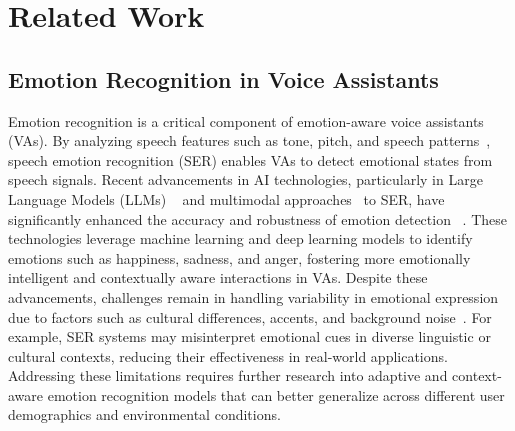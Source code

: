 \section{Related Work}
\subsection{Emotion Recognition in Voice Assistants}
Emotion recognition is a critical component of emotion-aware voice assistants (VAs). By analyzing speech features such as tone, pitch, and speech patterns~\cite{el2011survey,rathi2024analyzing,ma2024understanding}, speech emotion recognition (SER) enables VAs to detect emotional states from speech signals. Recent advancements in AI technologies, particularly in Large Language Models (LLMs) ~\cite{ma2024leveraging} and multimodal approaches~\cite{kumar2024multimodal} to SER, have significantly enhanced the accuracy and robustness of emotion detection ~\cite{lieskovska2021review,khalil2019speech}. These technologies leverage machine learning and deep learning models to identify emotions such as happiness, sadness, and anger, fostering more emotionally intelligent and contextually aware interactions in VAs.
Despite these advancements, challenges remain in handling variability in emotional expression due to factors such as cultural differences, accents, and background noise~\cite{mesquita1992cultural,can2023approaches}. For example, SER systems may misinterpret emotional cues in diverse linguistic or cultural contexts, reducing their effectiveness in real-world applications. Addressing these limitations requires further research into adaptive and context-aware emotion recognition models that can better generalize across different user demographics and environmental conditions.

